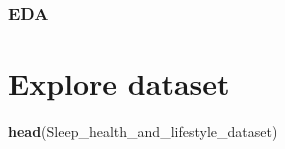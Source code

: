 \documentclass[
  11pt,
]{article}
\newenvironment{Shaded}{\begin{snugshade}}{\end{snugshade}}
\newcommand{\FunctionTok}[1]{\textcolor[rgb]{0.13,0.29,0.53}{\textbf{#1}}}
\newcommand{\NormalTok}[1]{#1}
\begin{document}
\hypertarget{eda}{%
\subsubsection{EDA}\label{eda}}

\hypertarget{explore-dataset}{%
\section{Explore dataset}\label{explore-dataset}}

\begin{Shaded}
\begin{Highlighting}[]
\FunctionTok{head}\NormalTok{(Sleep\_health\_and\_lifestyle\_dataset)}
\end{Highlighting}
\end{Shaded}
\end{document}
